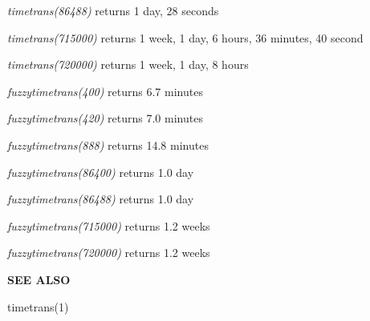 {\it timetrans(86488)} returns 1 day, 28 seconds

{\it timetrans(715000)} returns 1 week, 1 day, 6 hours, 36 minutes, 40 second

{\it timetrans(720000)} returns 1 week, 1 day, 8 hours

{\it fuzzytimetrans(400)} returns 6.7 minutes

{\it fuzzytimetrans(420)} returns 7.0 minutes

{\it fuzzytimetrans(888)} returns 14.8 minutes

{\it fuzzytimetrans(86400)} returns 1.0 day

{\it fuzzytimetrans(86488)} returns 1.0 day

{\it fuzzytimetrans(715000)} returns 1.2 weeks

{\it fuzzytimetrans(720000)} returns 1.2 weeks

{\bf SEE ALSO}

timetrans(1)

